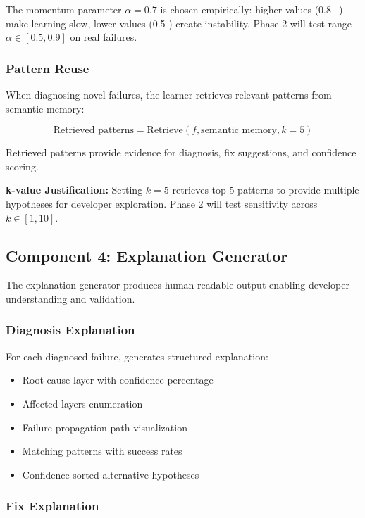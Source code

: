 \documentclass[11pt]{article}
\begin{document}
The momentum parameter $\alpha=0.7$ is chosen empirically: higher values (0.8+) make learning slow, lower values (0.5-) create instability. Phase 2 will test range $\alpha \in [0.5, 0.9]$ on real failures.

\subsubsection{Pattern Reuse}

When diagnosing novel failures, the learner retrieves relevant patterns from semantic memory:

\begin{equation}
\text{Retrieved\_patterns} = \text{Retrieve}(f, \text{semantic\_memory}, k=5)
\end{equation}

Retrieved patterns provide evidence for diagnosis, fix suggestions, and confidence scoring.

\textbf{k-value Justification:} Setting $k=5$ retrieves top-5 patterns to provide multiple hypotheses for developer exploration. Phase 2 will test sensitivity across $k \in [1, 10]$.

\subsection{Component 4: Explanation Generator}

The explanation generator produces human-readable output enabling developer understanding and validation.

\subsubsection{Diagnosis Explanation}

For each diagnosed failure, generates structured explanation:

\begin{itemize}
    \item Root cause layer with confidence percentage
    \item Affected layers enumeration
    \item Failure propagation path visualization
    \item Matching patterns with success rates
    \item Confidence-sorted alternative hypotheses
\end{itemize}

\subsubsection{Fix Explanation}
\end{document}
